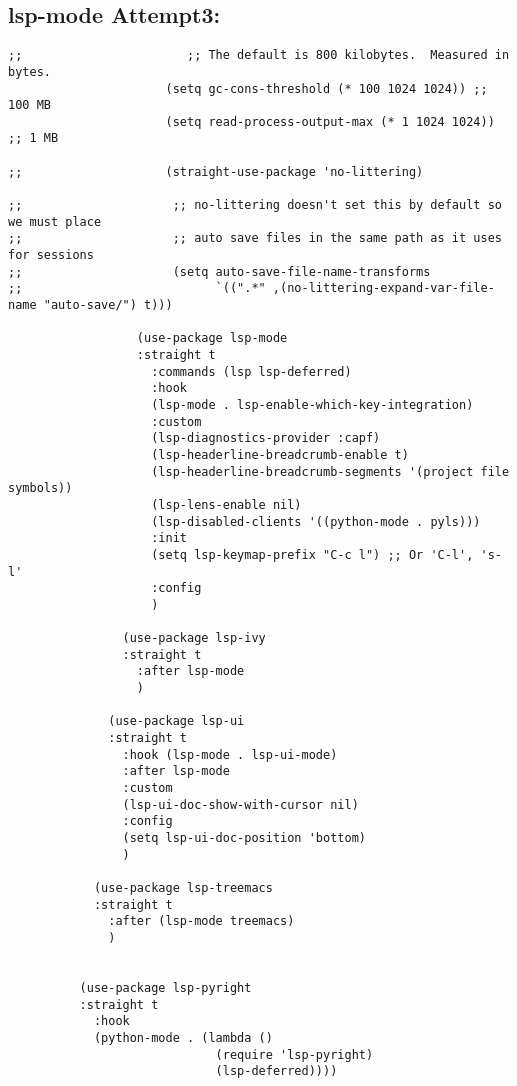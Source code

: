 \documentclass[11pt]{article}
\begin{document}
\subsection{lsp-mode Attempt3:}
\label{sec:org2665727}
\begin{verbatim}
;;                       ;; The default is 800 kilobytes.  Measured in bytes.
                      (setq gc-cons-threshold (* 100 1024 1024)) ;; 100 MB
                      (setq read-process-output-max (* 1 1024 1024)) ;; 1 MB

;;                    (straight-use-package 'no-littering)

;;                     ;; no-littering doesn't set this by default so we must place
;;                     ;; auto save files in the same path as it uses for sessions
;;                     (setq auto-save-file-name-transforms
;;                           `((".*" ,(no-littering-expand-var-file-name "auto-save/") t)))

                  (use-package lsp-mode
                  :straight t
                    :commands (lsp lsp-deferred)
                    :hook 
                    (lsp-mode . lsp-enable-which-key-integration)
                    :custom
                    (lsp-diagnostics-provider :capf)
                    (lsp-headerline-breadcrumb-enable t)
                    (lsp-headerline-breadcrumb-segments '(project file symbols))
                    (lsp-lens-enable nil)
                    (lsp-disabled-clients '((python-mode . pyls)))
                    :init
                    (setq lsp-keymap-prefix "C-c l") ;; Or 'C-l', 's-l'
                    :config
                    )

                (use-package lsp-ivy
                :straight t
                  :after lsp-mode
                  )

              (use-package lsp-ui
              :straight t
                :hook (lsp-mode . lsp-ui-mode)
                :after lsp-mode
                :custom
                (lsp-ui-doc-show-with-cursor nil)
                :config
                (setq lsp-ui-doc-position 'bottom)
                )

            (use-package lsp-treemacs
            :straight t
              :after (lsp-mode treemacs)
              )


          (use-package lsp-pyright
          :straight t
            :hook
            (python-mode . (lambda ()
                             (require 'lsp-pyright)
                             (lsp-deferred))))


\end{verbatim}
\end{document}
